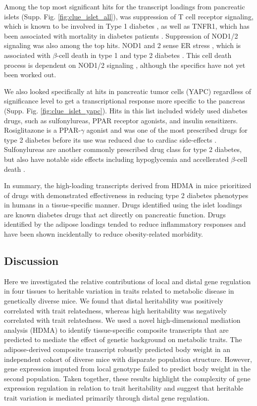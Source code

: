 \documentclass[
]{article}
\begin{document}
Among the top most significant hits for the transcript loadings from
pancreatic islets (Supp. Fig. \ref{fig:clue_islet_all}), was suppression
of T cell receptor signaling, which is known to be involved in Type 1
diabetes \cite{pmid33603744}, as well as TNFR1, which has been
associated with mortality in diabetes patients \cite{pmid32281000}.
Suppression of NOD1/2 signaling was also among the top hits. NOD1 and 2
sense ER stress \cite{pmid27007849, pmid28823510}, which is associated
with \(\beta\)-cell death in type 1 and type 2 diabetes
\cite{pmid24520198}. This cell death process is dependent on NOD1/2
signaling \cite{pmid27007849}, although the specifics have not yet been
worked out.

We also looked specifically at hits in pancreatic tumor cells (YAPC)
regardless of significance level to get a transcriptional response more
specific to the pancreas (Supp. Fig. \ref{fig:clue_islet_yapc}). Hits in
this list included widely used diabetes drugs, such as sulfonylureas,
PPAR receptor agonists, and insulin sensitizers. Rosiglitazone is a
PPAR-\(\gamma\) agonist and was one of the most prescribed drugs for
type 2 diabetes before its use was reduced due to cardiac side-effects
\cite{pmid21190462}. Sulfonylureas are another commonly prescribed drug
class for type 2 diabetes, but also have notable side effects including
hypoglycemia and accellerated \(\beta\)-cell death \cite{pmid16631807}.

In summary, the high-loading transcripts derived from HDMA in mice
prioritized of drugs with demonstrated effectiveness in reducing type 2
diabetes phenotypes in humans in a tissue-specific manner. Drugs
identified using the islet loadings are known diabetes drugs that act
directly on pancreatic function. Drugs identified by the adipose
loadings tended to reduce inflammatory responses and have been shown
incidentally to reduce obesity-related morbidity.

\subsection{Discussion}\label{discussion}

Here we investigated the relative contributions of local and distal gene
regulation in four tissues to heritable variation in traits related to
metabolic disease in genetically diverse mice. We found that distal
heritability was positively correlated with trait relatedness, whereas
high heritability was negatively correlated with trait relatedness. We
used a novel high-dimensional mediation analysis (HDMA) to identify
tissue-specific composite transcripts that are predicted to mediate the
effect of genetic background on metabolic traits. The adipose-derived
composite transcript robustly predicted body weight in an independent
cohort of diverse mice with disparate population structure. However,
gene expression imputed from local genotype failed to predict body
weight in the second population. Taken together, these results highlight
the complexity of gene expression regulation in relation to trait
heritability and suggest that heritable trait variation is mediated
primarily through distal gene regulation.
\end{document}
